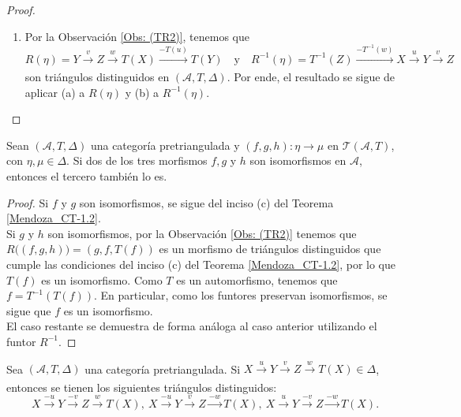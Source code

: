 \documentclass[tesis]{subfiles}
\begin{document}
\begin{proof}
\begin{enumerate}[label=(\alph*)]
        \item Por la Observación \ref{Obs: (TR2)}, tenemos que
            \[
            R(\eta) = Y\xrightarrow[]{v}Z\xrightarrow[]{w}T(X)\xrightarrow[]{-T(u)}T(Y) \quad \text{y} \quad R^{-1}(\eta) = T^{-1}(Z)\xrightarrow[]{-T^{-1}(w)}X\xrightarrow[]{u}Y\xrightarrow[]{v}Z
            \] 
            son triángulos distinguidos en $(\mathscr{A},T,\Delta)$. Por ende, el resultado se sigue de aplicar (a) a $R(\eta)$ y (b) a $R^{-1}(\eta)$.
    \end{enumerate}
\end{proof}


\begin{Prop}\label{Mendoza_CT-Ejer.3}
    
    Sean $(\mathscr{A},T,\Delta)$ una categoría pretriangulada y $(f,g,h):\eta\to \mu$ en $\mathscr{T}(\mathscr{A},T)$, con $\eta,\mu\in\Delta$. Si dos de los tres morfismos $f,g$ y $h$ son isomorfismos en $\mathscr{A}$, entonces el tercero también lo es.
\end{Prop}

\begin{proof}

    Si $f$ y $g$ son isomorfismos, se sigue del inciso (c) del Teorema \ref{Mendoza_CT-1.2}. \\

    Si $g$ y $h$ son isomorfismos, por la Observación \ref{Obs: (TR2)} tenemos que $R\big( (f,g,h) \big) = (g,f,T(f))$ es un morfismo de triángulos distinguidos que cumple las condiciones del inciso (c) del Teorema \ref{Mendoza_CT-1.2}, por lo que $T(f)$ es un isomorfismo. Como $T$ es un automorfismo, tenemos que $f = T^{-1}(T(f))$. En particular, como los funtores preservan isomorfismos, se sigue que $f$ es un isomorfismo. \\
    
    El caso restante se demuestra de forma análoga al caso anterior utilizando el funtor $R^{-1}$.
\end{proof}

\begin{Lema}\label{Mendoza_CT-Ejer.4}

    Sea $(\mathscr{A},T,\Delta)$ una categoría pretriangulada. Si $X\xrightarrow[]{u}Y\xrightarrow[]{v}Z\xrightarrow[]{w}T(X)\in\Delta$, entonces se tienen los siguientes triángulos distinguidos:
    \[
        X\xrightarrow[]{-u}Y\xrightarrow[]{-v}Z\xrightarrow[]{w}T(X), \ X\xrightarrow[]{-u}Y\xrightarrow[]{v}Z\xrightarrow[]{-w}T(X), \ X\xrightarrow[]{u}Y\xrightarrow[]{-v}Z\xrightarrow[]{-w}T(X).
    \] 
\end{Lema}
\end{document}
